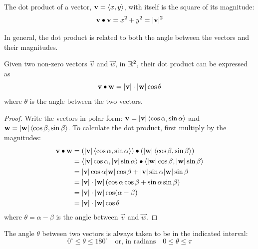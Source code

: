 \documentclass[handout]{ximera}
\begin{document}
The dot product of a vector,  $\mathbf{v} = \left\langle x, y\right\rangle$, with itself is the square of its magnitude:
\[
\mathbf{v} \bullet \mathbf{v} = x^2 + y^2 = |\mathbf{v}|^2
\]

In general, the dot product is related to both the angle between the vectors and their magnitudes.

\begin{proposition}
Given two non-zero vectors $\vec{v} $ and $\vec{w}$, in $\mathbb R^2$, 
their dot product can be expressed as
\[
\mathbf{v} \bullet \mathbf{w} = |\mathbf{v}| \cdot |\mathbf{w}| \cos \theta
\]
where $\theta$ is the angle between the two vectors.
\end{proposition}
\begin{proof}
Write the vectors in polar form: $\mathbf{v} = |\mathbf{v}| \left\langle \cos \alpha, \sin \alpha\right\rangle$ and 
$\mathbf{w} = |\mathbf{w}| \left\langle \cos \beta, \sin \beta\right\rangle$. To calculate the dot product, first multiply by the magnitudes:
\begin{align*}
\mathbf{v} \bullet \mathbf{w} & = \left(|\mathbf{v}| \left\langle \cos \alpha, \sin \alpha\right\rangle\right) \bullet \left( |\mathbf{w}| \left\langle \cos \beta, \sin \beta\right\rangle \right)\\
                            &= \left\langle |\mathbf{v}|\cos \alpha, |\mathbf{v}|\sin \alpha\right\rangle \bullet   \left\langle |\mathbf{w}|\cos \beta, |\mathbf{w}|\sin \beta\right\rangle \\
                            &= |\mathbf{v}| \cos \alpha |\mathbf{w}|\cos \beta + |\mathbf{v}|\sin \alpha |\mathbf{w}|\sin \beta\\
                            &= |\mathbf{v}|\cdot |\mathbf{w}| \left(\cos \alpha \cos \beta + \sin \alpha \sin \beta\right)\\
                            &= |\mathbf{v}| \cdot|\mathbf{w}| \cos(\alpha - \beta)\\
                            &= |\mathbf{v}| \cdot |\mathbf{w}| \cos \theta
\end{align*}
where $\theta = \alpha - \beta$ is the angle between $\vec{v}$ and $\vec{w}$.
\end{proof}


\begin{remark} The angle $\theta$ between two vectors is always taken to be in the indicated interval:
\[
0^\circ \leq \theta \leq 180^\circ \quad \text{or, in radians} \quad 0 \leq \theta \leq \pi
\]
\end{remark}
\end{document}
